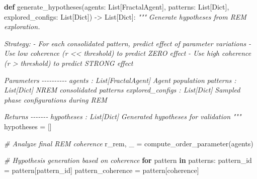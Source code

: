 \documentclass[
]{article}
\newenvironment{Shaded}{}{}
\newcommand{\CommentTok}[1]{\textcolor[rgb]{0.38,0.63,0.69}{\textit{#1}}}
\newcommand{\ControlFlowTok}[1]{\textcolor[rgb]{0.00,0.44,0.13}{\textbf{#1}}}
\newcommand{\KeywordTok}[1]{\textcolor[rgb]{0.00,0.44,0.13}{\textbf{#1}}}
\newcommand{\NormalTok}[1]{#1}
\newcommand{\OperatorTok}[1]{\textcolor[rgb]{0.40,0.40,0.40}{#1}}
\newcommand{\StringTok}[1]{\textcolor[rgb]{0.25,0.44,0.63}{#1}}
\begin{document}
\begin{Shaded}
\begin{Highlighting}[]
\KeywordTok{def}\NormalTok{ generate\_hypotheses(agents: List[FractalAgent],}
\NormalTok{                       patterns: List[Dict],}
\NormalTok{                       explored\_configs: List[Dict]) }\OperatorTok{{-}\textgreater{}}\NormalTok{ List[Dict]:}
    \CommentTok{"""}
\CommentTok{    Generate hypotheses from REM exploration.}

\CommentTok{    Strategy:}
\CommentTok{    {-} For each consolidated pattern, predict effect of parameter variations}
\CommentTok{    {-} Use low coherence (r \textless{}\textless{} threshold) to predict ZERO effect}
\CommentTok{    {-} Use high coherence (r \textgreater{} threshold) to predict STRONG effect}

\CommentTok{    Parameters}
\CommentTok{    {-}{-}{-}{-}{-}{-}{-}{-}{-}{-}}
\CommentTok{    agents : List[FractalAgent]}
\CommentTok{        Agent population}
\CommentTok{    patterns : List[Dict]}
\CommentTok{        NREM consolidated patterns}
\CommentTok{    explored\_configs : List[Dict]}
\CommentTok{        Sampled phase configurations during REM}

\CommentTok{    Returns}
\CommentTok{    {-}{-}{-}{-}{-}{-}{-}}
\CommentTok{    hypotheses : List[Dict]}
\CommentTok{        Generated hypotheses for validation}
\CommentTok{    """}
\NormalTok{    hypotheses }\OperatorTok{=}\NormalTok{ []}

    \CommentTok{\# Analyze final REM coherence}
\NormalTok{    r\_rem, \_ }\OperatorTok{=}\NormalTok{ compute\_order\_parameter(agents)}

    \CommentTok{\# Hypothesis generation based on coherence}
    \ControlFlowTok{for}\NormalTok{ pattern }\KeywordTok{in}\NormalTok{ patterns:}
\NormalTok{        pattern\_id }\OperatorTok{=}\NormalTok{ pattern[}\StringTok{\textquotesingle{}pattern\_id\textquotesingle{}}\NormalTok{]}
\NormalTok{        pattern\_coherence }\OperatorTok{=}\NormalTok{ pattern[}\StringTok{\textquotesingle{}coherence\textquotesingle{}}\NormalTok{]}


\end{Highlighting}
\end{Shaded}
\end{document}
